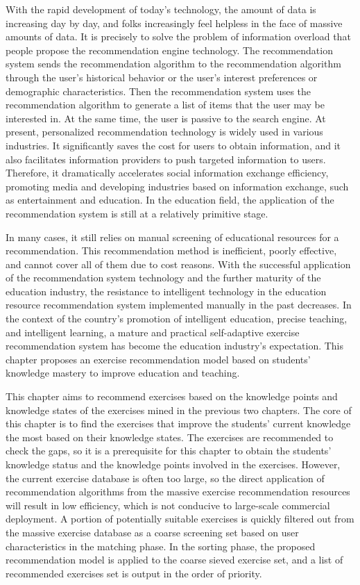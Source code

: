 With the rapid development of today's technology, the amount of data is increasing day by day, and folks increasingly feel helpless in the face of massive amounts of data. It is precisely to solve the problem of information overload that people propose the recommendation engine technology. The recommendation system sends the recommendation algorithm to the recommendation algorithm through the user's historical behavior or the user's interest preferences or demographic characteristics. Then the recommendation system uses the recommendation algorithm to generate a list of items that the user may be interested in. At the same time, the user is passive to the search engine. At present, personalized recommendation technology is widely used in various industries. It significantly saves the cost for users to obtain information, and it also facilitates information providers to push targeted information to users. Therefore, it dramatically accelerates social information exchange efficiency, promoting media and developing industries based on information exchange, such as entertainment and education. In the education field, the application of the recommendation system is still at a relatively primitive stage.

In many cases, it still relies on manual screening of educational resources for a recommendation. This recommendation method is inefficient, poorly effective, and cannot cover all of them due to cost reasons. With the successful application of the recommendation system technology and the further maturity of the education industry, the resistance to intelligent technology in the education resource recommendation system implemented manually in the past decreases. In the context of the country's promotion of intelligent education, precise teaching, and intelligent learning, a mature and practical self-adaptive exercise recommendation system has become the education industry's expectation. This chapter proposes an exercise recommendation model based on students' knowledge mastery to improve education and teaching.

This chapter aims to recommend exercises based on the knowledge points and knowledge states of the exercises mined in the previous two chapters. The core of this chapter is to find the exercises that improve the students' current knowledge the most based on their knowledge states. The exercises are recommended to check the gaps, so it is a prerequisite for this chapter to obtain the students' knowledge status and the knowledge points involved in the exercises.  However, the current exercise database is often too large, so the direct application of recommendation algorithms from the massive exercise recommendation resources will result in low efficiency, which is not conducive to large-scale commercial deployment. A portion of potentially suitable exercises is quickly filtered out from the massive exercise database as a coarse screening set based on user characteristics in the matching phase. In the sorting phase, the proposed recommendation model is applied to the coarse sieved exercise set, and a list of recommended exercises set is output in the order of priority.

